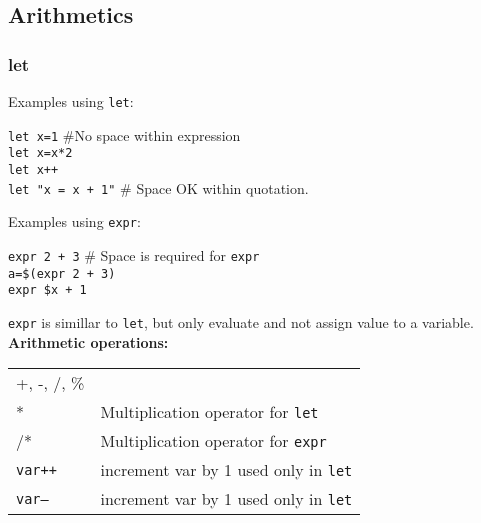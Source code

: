 \subsection{Arithmetics}
\subsubsection{let}
Examples using \texttt{let}:\\

\begin{mdframed}
\texttt{let x=1} \#No space within expression\\
\texttt{let x=x*2}\\
\texttt{let x++}\\
\texttt{let "x = x + 1"} \# Space OK within quotation.
\end{mdframed}

Examples using \texttt{expr}:
\begin{mdframed}
\texttt{expr 2 + 3} \# Space is required for \texttt{expr}\\
\texttt{a=\$(expr 2 + 3)}\\
\texttt{expr \$x + 1}
\end{mdframed}

\texttt{expr} is simillar to \texttt{let}, but only evaluate and not assign value to a variable.\\

\textbf{Arithmetic operations:}

\begin{tabularx}{\linewidth}{lX}
+, -, /, \% & \\
* & Multiplication operator for \texttt{let}\\
/* & Multiplication operator for \texttt{expr}\\
\texttt{var++} & increment var by 1 used only in \texttt{let}\\
\texttt{var--} & increment var by 1 used only in \texttt{let}
\end{tabularx}


\vfill\null
\pagebreak

